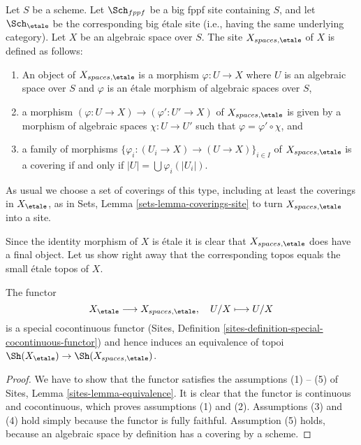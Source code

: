 \begin{definition}
\label{definition-spaces-etale-site}
Let $S$ be a scheme.
Let $\Sch_{fppf}$ be a big fppf site containing $S$,
and let $\Sch_\etale$ be the corresponding big \'etale site
(i.e., having the same underlying category).
Let $X$ be an algebraic space over $S$.
The site {\it $X_{spaces, \etale}$} of $X$ is defined as follows:
\begin{enumerate}
\item An object of $X_{spaces, \etale}$ is a morphism
$\varphi : U \to X$ where $U$ is an algebraic space over $S$ and
$\varphi$ is an \'etale morphism of algebraic spaces over $S$,
\item a morphism $(\varphi : U \to X) \to (\varphi' : U' \to X)$ of
$X_{spaces, \etale}$ is given by a morphism of algebraic spaces
$\chi : U \to U'$ such that $\varphi = \varphi' \circ \chi$, and
\item a family of morphisms
$\{\varphi_i : (U_i \to X) \to (U \to X)\}_{i \in I}$
of $X_{spaces, \etale}$ is a covering if and only if
$|U| = \bigcup \varphi_i(|U_i|)$.
\end{enumerate}
As usual we choose a set of coverings of this type, including at least
the coverings in $X_\etale$, as in
Sets, Lemma \ref{sets-lemma-coverings-site}
to turn $X_{spaces, \etale}$ into a site.
\end{definition}

\noindent
Since the identity morphism of $X$ is \'etale it is clear that
$X_{spaces, \etale}$ does have a final object.
Let us show right away that the corresponding topos equals the
small \'etale topos of $X$.

\begin{lemma}
\label{lemma-compare-etale-sites}
The functor
$$
X_\etale \longrightarrow X_{spaces, \etale}, \quad
U/X \longmapsto U/X
$$
is a special cocontinuous functor
(Sites, Definition \ref{sites-definition-special-cocontinuous-functor})
and hence induces an equivalence of topoi
$\Sh(X_\etale) \to \Sh(X_{spaces, \etale})$.
\end{lemma}

\begin{proof}
We have to show that the functor satisfies the assumptions (1) -- (5) of
Sites, Lemma \ref{sites-lemma-equivalence}.
It is clear that the functor is continuous and cocontinuous, which
proves assumptions (1) and (2).
Assumptions (3) and (4) hold simply because the functor is fully faithful.
Assumption (5) holds, because an algebraic space by definition has
a covering by a scheme.
\end{proof}

